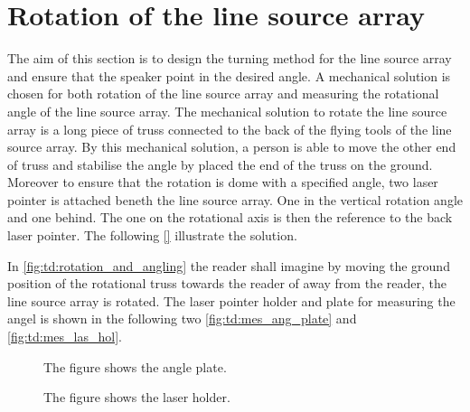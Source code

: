\section{Rotation of the line source array}
The aim of this section is to design the turning method for the line source array and ensure that the speaker point in the desired angle. A mechanical solution is chosen for both rotation of the line source array and measuring the rotational angle of the line source array. The mechanical solution to rotate the line source array is a long piece of truss connected to the back of the flying tools of the line source array. By this mechanical solution, a person is able to move the other end of truss and stabilise the angle by placed the end of the truss on the ground. Moreover to ensure that the rotation is dome with a specified angle, two laser pointer is attached beneth the line source array. One in the vertical rotation angle and one behind. The one on the rotational axis is then the reference to the back laser pointer. The following \autoref{} illustrate the solution.


In \autoref{fig:td:rotation_and_angling} the reader shall imagine by moving the ground position of the rotational truss towards the reader of away from the reader, the line source array is rotated. The laser pointer holder and plate for measuring the angel is shown in the following two \autoref{fig:td:mes_ang_plate} and \autoref{fig:td:mes_las_hol}.


\begin{figure}[H]
    \centering
     \captionsetup{width=1\linewidth}
    \begin{minipage}{0.36\textwidth}
        \centering
         \captionsetup{width=0.90\linewidth}
       
        \caption{The figure shows the angle plate.}
        \label{fig:td:mes_ang_plate}
    \end{minipage}%
    \begin{minipage}{0.56\textwidth}
        \centering
         \captionsetup{width=0.90\linewidth}
        
        \caption{The figure shows the laser holder.}
        \label{fig:td:mes_las_hol}
    \end{minipage}
\end{figure}


